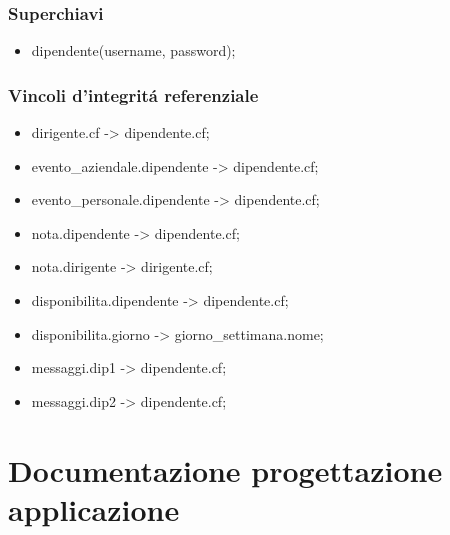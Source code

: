 \documentclass[paper=a4, fontsize=11pt]{scrartcl} %
\numberwithin{equation}{section} %
\numberwithin{figure}{section} %
\numberwithin{table}{section} %
\begin{document}
\subsubsection*{Superchiavi}

\begin{itemize}
  \item dipendente(username, password);

\end{itemize}



\subsubsection*{Vincoli d'integrit\'a referenziale}

\begin{itemize}

  \item dirigente.cf -> dipendente.cf;
  \item evento\_aziendale.dipendente -> dipendente.cf;
  \item evento\_personale.dipendente -> dipendente.cf;
  \item nota.dipendente -> dipendente.cf;
  \item nota.dirigente -> dirigente.cf;
  \item disponibilita.dipendente -> dipendente.cf;
  \item disponibilita.giorno -> giorno\_settimana.nome;
  \item messaggi.dip1 -> dipendente.cf;
  \item messaggi.dip2 -> dipendente.cf;


\end{itemize}

\newpage
\section{Documentazione progettazione applicazione}
\end{document}
